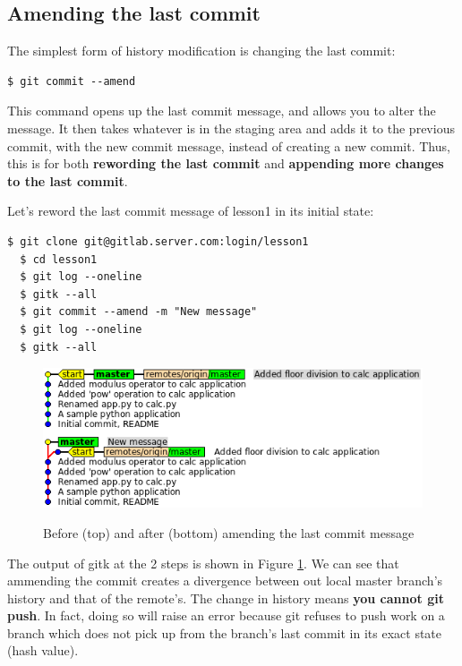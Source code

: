 \documentclass{../common/tufte-latex/tufte-handout}
\begin{document}
\subsection{Amending the last commit}
The simplest form of history modification is changing the last commit:

\begin{lstlisting}[style=BashInputStyle]
  $ git commit --amend
\end{lstlisting}

This command opens up the last commit message, and allows you to alter the message.
It then takes whatever is in the staging area and adds it to the previous commit, with the new commit message, instead of creating a new commit.
Thus, this is for both \textbf{rewording the last commit} and \textbf{appending more changes to the last commit}.

Let's reword the last commit message of lesson1 in its initial state:

\begin{lstlisting}[style=BashInputStyle]
  $ git clone git@gitlab.server.com:login/lesson1
  $ cd lesson1
  $ git log --oneline
  $ gitk --all
  $ git commit --amend -m "New message"
  $ git log --oneline
  $ gitk --all
\end{lstlisting}

\begin{figure}%
  \centering
  \includegraphics[width=0.85\linewidth]{gitcommit-amend.png}
  \label{fig:gitcommit-amend}
  \caption{Before (top) and after (bottom) amending the last commit message}
\end{figure}

The output of gitk at the 2 steps is shown in Figure \ref{fig:gitcommit-amend}.
We can see that ammending the commit creates a divergence between out local master branch's history and that of the remote's.
The change in history means \textbf{you cannot git push}. 
In fact, doing so will raise an error because git refuses to push work on a branch which does not pick up from the branch's last commit in its exact state (hash value).
\end{document}
